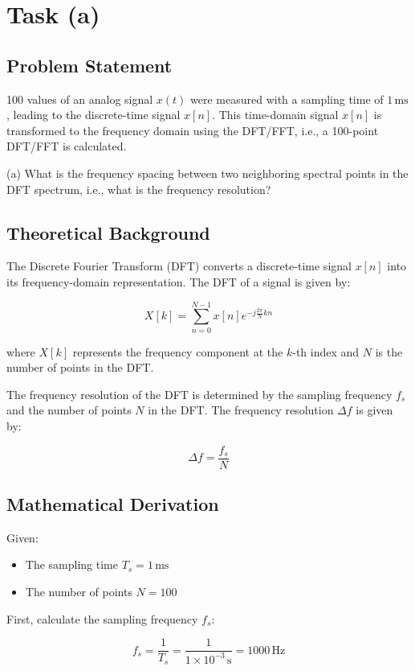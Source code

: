 \item[(a)]
\section*{Task (a)}

\subsection*{Problem Statement}
100 values of an analog signal \( x(t) \) were measured with a sampling time of \( 1 \, \text{ms} \), leading to the discrete-time signal \( x[n] \). This time-domain signal \( x[n] \) is transformed to the frequency domain using the DFT/FFT, i.e., a 100-point DFT/FFT is calculated.

(a) What is the frequency spacing between two neighboring spectral points in the DFT spectrum, i.e., what is the frequency resolution?

\subsection*{Theoretical Background}
The Discrete Fourier Transform (DFT) converts a discrete-time signal \( x[n] \) into its frequency-domain representation. The DFT of a signal is given by:

\[ X[k] = \sum_{n=0}^{N-1} x[n] e^{-j \frac{2 \pi}{N} kn} \]

where \( X[k] \) represents the frequency component at the \( k \)-th index and \( N \) is the number of points in the DFT.

The frequency resolution of the DFT is determined by the sampling frequency \( f_s \) and the number of points \( N \) in the DFT. The frequency resolution \( \Delta f \) is given by:

\[ \Delta f = \frac{f_s}{N} \]

\subsection*{Mathematical Derivation}
Given:
\begin{itemize}
    \item The sampling time \( T_s = 1 \, \text{ms} \)
    \item The number of points \( N = 100 \)
\end{itemize}

First, calculate the sampling frequency \( f_s \):

\[ f_s = \frac{1}{T_s} = \frac{1}{1 \times 10^{-3} \, \text{s}} = 1000 \, \text{Hz} \]

